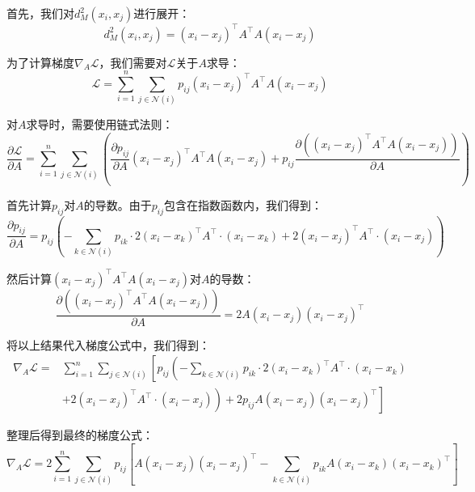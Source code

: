 \documentclass[12pt]{article}
\begin{document}
首先，我们对$d_M^2(x_i, x_j)$进行展开：
\begin{equation}
  d_M^2(x_i, x_j) = (x_i - x_j)^\top A^\top A (x_i - x_j)
\end{equation}

为了计算梯度$\nabla_A \mathcal{L}$，我们需要对$\mathcal{L}$关于$A$求导：
\begin{equation}
  \mathcal{L} = \sum_{i=1}^n \sum_{j \in \mathcal{N}(i)} p_{ij} (x_i - x_j)^\top A^\top A (x_i - x_j)
\end{equation}

对$A$求导时，需要使用链式法则：
\begin{equation}
  \frac{\partial \mathcal{L}}{\partial A} = \sum_{i=1}^n \sum_{j \in \mathcal{N}(i)} \left( \frac{\partial p_{ij}}{\partial A} (x_i - x_j)^\top A^\top A (x_i - x_j) + p_{ij} \frac{\partial ((x_i - x_j)^\top A^\top A (x_i - x_j))}{\partial A} \right)
\end{equation}

首先计算$p_{ij}$对$A$的导数。由于$p_{ij}$包含在指数函数内，我们得到：
\begin{equation}
  \frac{\partial p_{ij}}{\partial A} = p_{ij} \left( -\sum_{k \in \mathcal{N}(i)} p_{ik} \cdot 2(x_i - x_k)^\top A^\top \cdot (x_i - x_k) + 2(x_i - x_j)^\top A^\top \cdot (x_i - x_j) \right)
\end{equation}

然后计算$(x_i - x_j)^\top A^\top A (x_i - x_j)$对$A$的导数：
\begin{equation}
  \frac{\partial ((x_i - x_j)^\top A^\top A (x_i - x_j))}{\partial A} = 2 A (x_i - x_j) (x_i - x_j)^\top
\end{equation}

将以上结果代入梯度公式中，我们得到：
\begin{equation}
  \begin{aligned}
    \nabla_A \mathcal{L} = & \sum_{i=1}^n \sum_{j \in \mathcal{N}(i)} \left[ p_{ij} \left( -\sum_{k \in \mathcal{N}(i)} p_{ik} \cdot 2(x_i - x_k)^\top A^\top \cdot (x_i - x_k) \right. \right. \\
                           & \left. \left. + 2(x_i - x_j)^\top A^\top \cdot (x_i - x_j) \right) + 2 p_{ij} A (x_i - x_j) (x_i - x_j)^\top \right]
  \end{aligned}
\end{equation}

整理后得到最终的梯度公式：
\begin{equation}
  \nabla_A \mathcal{L} = 2 \sum_{i=1}^n \sum_{j \in \mathcal{N}(i)} p_{ij} \left[ A (x_i - x_j) (x_i - x_j)^\top - \sum_{k \in \mathcal{N}(i)} p_{ik} A (x_i - x_k) (x_i - x_k)^\top \right]
\end{equation}
\end{document}
